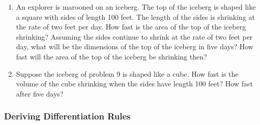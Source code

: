 \begin{enumerate}
\item An explorer is marooned on an iceberg.  The top of the iceberg is
shaped like a square with sides of length 100 feet.  The length of the
sides is shrinking at the rate of two feet per day.  How fast is the
area of the top of the iceberg shrinking?  Assuming the sides continue
to shrink at the rate of two feet per day, what will be the dimensions
of the top of the iceberg in five days?  How fast will the area of the
top of the iceberg be shrinking then?


\item Suppose the iceberg of problem 9 is shaped like a cube.  How fast
is the volume of the cube shrinking when the sides have length 100
feet?  How fast after five days?


\end{enumerate}
\subsubsection{Deriving Differentiation Rules}
\label{subsubsec:deriving-differentiation-rules}




